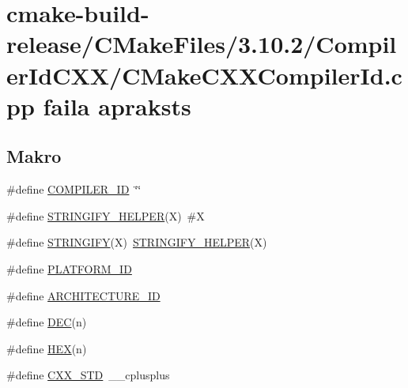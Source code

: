 \hypertarget{cmake-build-release_2_c_make_files_23_810_82_2_compiler_id_c_x_x_2_c_make_c_x_x_compiler_id_8cpp}{}\section{cmake-\/build-\/release/\+C\+Make\+Files/3.10.2/\+Compiler\+Id\+C\+X\+X/\+C\+Make\+C\+X\+X\+Compiler\+Id.cpp faila apraksts}
\label{cmake-build-release_2_c_make_files_23_810_82_2_compiler_id_c_x_x_2_c_make_c_x_x_compiler_id_8cpp}
\subsection*{Makro}
\begin{DoxyCompactItemize}
\item 
\#define \hyperlink{cmake-build-release_2_c_make_files_23_810_82_2_compiler_id_c_x_x_2_c_make_c_x_x_compiler_id_8cpp_a81dee0709ded976b2e0319239f72d174}{C\+O\+M\+P\+I\+L\+E\+R\+\_\+\+ID}~\char`\"{}\char`\"{}
\item 
\#define \hyperlink{cmake-build-release_2_c_make_files_23_810_82_2_compiler_id_c_x_x_2_c_make_c_x_x_compiler_id_8cpp_a2ae9b72bb13abaabfcf2ee0ba7d3fa1d}{S\+T\+R\+I\+N\+G\+I\+F\+Y\+\_\+\+H\+E\+L\+P\+ER}(X)~\#X
\item 
\#define \hyperlink{cmake-build-release_2_c_make_files_23_810_82_2_compiler_id_c_x_x_2_c_make_c_x_x_compiler_id_8cpp_a43e1cad902b6477bec893cb6430bd6c8}{S\+T\+R\+I\+N\+G\+I\+FY}(X)~\hyperlink{cmake-build-release_2_c_make_files_23_810_82_2_compiler_id_c_x_x_2_c_make_c_x_x_compiler_id_8cpp_a2ae9b72bb13abaabfcf2ee0ba7d3fa1d}{S\+T\+R\+I\+N\+G\+I\+F\+Y\+\_\+\+H\+E\+L\+P\+ER}(X)
\item 
\#define \hyperlink{cmake-build-release_2_c_make_files_23_810_82_2_compiler_id_c_x_x_2_c_make_c_x_x_compiler_id_8cpp_adbc5372f40838899018fadbc89bd588b}{P\+L\+A\+T\+F\+O\+R\+M\+\_\+\+ID}
\item 
\#define \hyperlink{cmake-build-release_2_c_make_files_23_810_82_2_compiler_id_c_x_x_2_c_make_c_x_x_compiler_id_8cpp_aba35d0d200deaeb06aee95ca297acb28}{A\+R\+C\+H\+I\+T\+E\+C\+T\+U\+R\+E\+\_\+\+ID}
\item 
\#define \hyperlink{cmake-build-release_2_c_make_files_23_810_82_2_compiler_id_c_x_x_2_c_make_c_x_x_compiler_id_8cpp_ad1280362da42492bbc11aa78cbf776ad}{D\+EC}(n)
\item 
\#define \hyperlink{cmake-build-release_2_c_make_files_23_810_82_2_compiler_id_c_x_x_2_c_make_c_x_x_compiler_id_8cpp_a46d5d95daa1bef867bd0179594310ed5}{H\+EX}(n)
\item 
\#define \hyperlink{cmake-build-release_2_c_make_files_23_810_82_2_compiler_id_c_x_x_2_c_make_c_x_x_compiler_id_8cpp_a34cc889e576a1ae6c84ae9e0a851ba21}{C\+X\+X\+\_\+\+S\+TD}~\+\_\+\+\_\+cplusplus
\end{DoxyCompactItemize}
